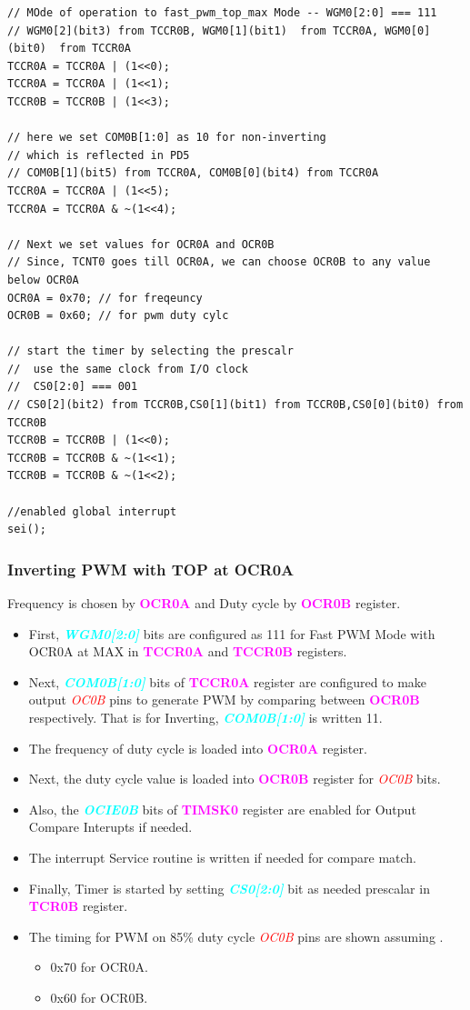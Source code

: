 \documentclass{article}
\newcommand{\bitFormat}[1]{\emph{\textbf{\textcolor{cyan}{#1}}}}
\newcommand{\regFormat}[1]{\textbf{\textcolor{magenta}{#1}}}
\newcommand{\pinFormat}[1]{\emph{\textcolor{red}{#1}}}
\begin{document}
\begin{verbatim}
// MOde of operation to fast_pwm_top_max Mode -- WGM0[2:0] === 111
// WGM0[2](bit3) from TCCR0B, WGM0[1](bit1)  from TCCR0A, WGM0[0](bit0)  from TCCR0A
TCCR0A = TCCR0A | (1<<0);
TCCR0A = TCCR0A | (1<<1);
TCCR0B = TCCR0B | (1<<3);	

// here we set COM0B[1:0] as 10 for non-inverting
// which is reflected in PD5
// COM0B[1](bit5) from TCCR0A, COM0B[0](bit4) from TCCR0A
TCCR0A = TCCR0A | (1<<5);
TCCR0A = TCCR0A & ~(1<<4);

// Next we set values for OCR0A and OCR0B
// Since, TCNT0 goes till OCR0A, we can choose OCR0B to any value below OCR0A
OCR0A = 0x70; // for freqeuncy
OCR0B = 0x60; // for pwm duty cylc

// start the timer by selecting the prescalr
//  use the same clock from I/O clock
//  CS0[2:0] === 001
// CS0[2](bit2) from TCCR0B,CS0[1](bit1) from TCCR0B,CS0[0](bit0) from TCCR0B
TCCR0B = TCCR0B | (1<<0);
TCCR0B = TCCR0B & ~(1<<1);
TCCR0B = TCCR0B & ~(1<<2);

//enabled global interrupt
sei();
\end{verbatim}

\subsubsection{Inverting PWM with TOP at  OCR0A}
\quad Frequency is chosen by \regFormat{OCR0A} and Duty cycle by \regFormat{OCR0B} register.
\begin{itemize}
    \item First, \bitFormat{WGM0[2:0]} bits are configured as 111 for Fast PWM Mode with OCR0A at MAX in \regFormat{TCCR0A} and \regFormat{TCCR0B} registers.
    \item Next, \bitFormat{COM0B[1:0]} bits of \regFormat{TCCR0A} register are configured to make output \pinFormat{OC0B} pins to generate PWM by comparing between \regFormat{OCR0B} respectively. That is for Inverting, \bitFormat{COM0B[1:0]} is written 11.
    \item The frequency of duty cycle is loaded into \regFormat{OCR0A} register.
    \item Next, the duty cycle value is loaded into \regFormat{OCR0B} register for \pinFormat{OC0B} bits.
    \item Also, the \bitFormat{OCIE0B} bits of \regFormat{TIMSK0} register  are enabled for Output Compare Interupts if needed.
    \item The interrupt Service routine is written if needed for compare match.
    \item Finally, Timer is started by setting \bitFormat{CS0[2:0]} bit as needed prescalar in \regFormat{TCR0B} register.
    \item The timing for PWM on 85\% duty cycle \pinFormat{OC0B} pins are shown assuming .
    \begin{itemize}
        \item 0x70 for OCR0A.
        \item 0x60 for OCR0B.
    \end{itemize}
\end{itemize}
\end{document}
